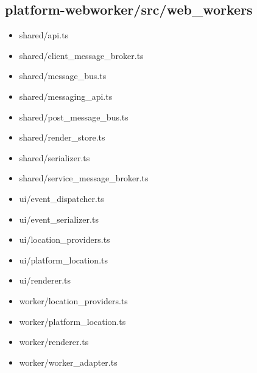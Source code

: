 \subsection{platform-webworker/src/web\_workers}


\begin{itemize}
  \item shared/api.ts
  \item shared/client\_message\_broker.ts
  \item shared/message\_bus.ts
  \item shared/messaging\_api.ts
  \item shared/post\_message\_bus.ts
  \item shared/render\_store.ts
  \item shared/serializer.ts
  \item shared/service\_message\_broker.ts
  \item ui/event\_dispatcher.ts
  \item ui/event\_serializer.ts
  \item ui/location\_providers.ts
  \item ui/platform\_location.ts
  \item ui/renderer.ts
  \item worker/location\_providers.ts
  \item worker/platform\_location.ts
  \item worker/renderer.ts
  \item worker/worker\_adapter.ts
\end{itemize}





